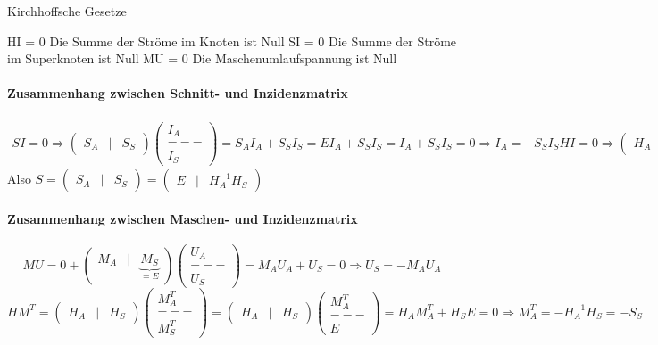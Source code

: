 \documentclass[german]{article}
\begin{document}
Kirchhoffsche Gesetze

HI = 0 Die Summe der Ströme im Knoten ist Null
SI = 0 Die Summe der Ströme im Superknoten ist Null
MU = 0 Die Maschenumlaufspannung ist Null

\paragraph{Zusammenhang zwischen Schnitt- und Inzidenzmatrix}
\[
	\left. \begin{array}{l}
	SI = 0 \Rightarrow \begin{pmatrix} S_A & | & S_S \end{pmatrix} \begin{pmatrix} I_A \\ --- \\ I_S \end{pmatrix} = S_A I_A + S_S I_S = E I_A + S_S I_S = I_A + S_S I_S = 0 \Rightarrow I_A = - S_S I_S
	HI = 0 \Rightarrow \begin{pmatrix} H_A & | & H_S \end{pmatrix} \begin{pmatrix} I_A \\ --- \\ I_S \end{pmatrix} = H_A I_A + H_S I_S = 0 \Rightarrow I_A = -H_A^{-1} H_S I_S
	\end{array} \right\} \Rightarrow S_S = H_A^{-1} H_S
\]
Also $S = \begin{pmatrix} S_A & | & S_S \end{pmatrix} = \begin{pmatrix} E & | & H_A^{-1} H_S \end{pmatrix}$

\paragraph{Zusammenhang zwischen Maschen- und Inzidenzmatrix}
\[
	MU = 0 + \begin{pmatrix} M_A & | & \underbrace{M_S}_{=E} \end{pmatrix} \begin{pmatrix} U_A \\ --- \\ U_S \end{pmatrix} = M_A U_A + U_S = 0 \Rightarrow U_S = - M_A U_A
\]
\[
	H M^T = \begin{pmatrix} H_A & | & H_S \end{pmatrix} \begin{pmatrix} M_A^T \\ --- \\ M_S^T \end{pmatrix} = \begin{pmatrix} H_A & | & H_S \end{pmatrix} \begin{pmatrix} M_A^T \\ --- \\ E \end{pmatrix} = H_A M_A^T + H_S E = 0 \Rightarrow M_A^T = -H_A^{-1} H_S = -S_S
\]
\end{document}
